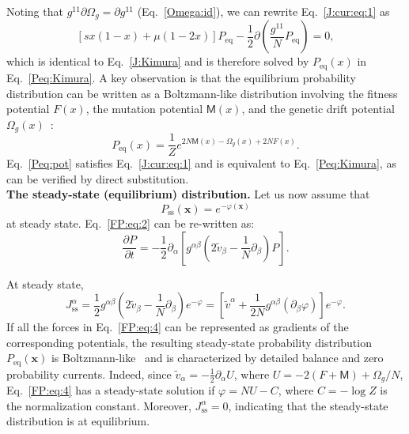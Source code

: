\documentclass[9pt,twocolumn,twoside]{gsajnl}
\begin{document}
Noting that $g^{11} \partial \Omega_g = \partial g^{11}$ (Eq.~\eqref{Omega:id}), we can rewrite Eq.~\eqref{J:cur:eq:1} as
\begin{equation} \label{J:cur:eq:2}
[s x (1-x) + \mu (1-2x)] P_\text{eq} - \frac{1}{2} \partial \left( \frac{g^{11}}{N} P_\text{eq} \right) = 0,
\end{equation}
which is identical to Eq.~\eqref{J:Kimura} and is therefore solved by $P_\text{eq} (x)$ in Eq.~\eqref{Peq:Kimura}. A key observation is that the equilibrium probability distribution
can be written as a Boltzmann-like distribution involving the fitness potential $F(x)$, the mutation potential $\mathsf{M} (x)$, and the genetic drift potential $\Omega_g (x)$~\citep{Mustonen2010}:
\begin{equation} \label{Peq:pot}
P_\text{eq} (x) = \frac{1}{Z} e^{2 N \mathsf{M} (x) - \Omega_g(x) + 2 N F(x)}.
\end{equation}
Eq.~\eqref{Peq:pot} satisfies Eq.~\eqref{J:cur:eq:1} and is equivalent to Eq.~\eqref{Peq:Kimura}, as can be verified by direct substitution. \\

\noindent
\textbf{The steady-state (equilibrium) distribution.} Let us now assume that
\begin{equation} \label{P:ss}
P_\text{ss} (\mathbf{x}) = e^{-\varphi(\mathbf{x})}
\end{equation}
at steady state. Eq.~\eqref{FP:eq:2} can be re-written as:
\begin{equation} \label{FP:eq:4}
\frac{\partial P}{\partial t} = -\frac{1}{2} \partial_\alpha \left[ g^{\alpha \beta} (2 \widetilde{v}_\beta - \frac{1}{N} \partial_\beta)  P \right].
\end{equation}

At steady state,
\begin{equation} \label{J:ss}
J^\alpha_\text{ss} = \frac{1}{2} g^{\alpha \beta} (2 \widetilde{v}_\beta - \frac{1}{N} \partial_\beta) e^{-\varphi} = \left[ \widetilde{v}^\alpha + \frac{1}{2N} g^{\alpha \beta} (\partial_\beta \varphi) \right] e^{-\varphi}.
\end{equation}
If all the forces in Eq.~\eqref{FP:eq:4} can be represented as gradients of the corresponding potentials, the resulting steady-state probability distribution $P_\text{eq} (\mathbf{x})$
is Boltzmann-like~\citep{Mustonen2010} and is characterized by detailed balance and zero probability currents. Indeed,
since $\widetilde{v}_\alpha = - \frac{1}{2} \partial_\alpha U$, where $U = -2 (F + \mathsf{M}) + \Omega_g/N$, Eq.~\eqref{FP:eq:4} has a steady-state solution if
$\varphi = N U - C$, where $C = - \log Z$ is the normalization constant. Moreover, $J^\alpha_\text{ss} = 0$, indicating that
the steady-state distribution is at equilibrium.
\end{document}
